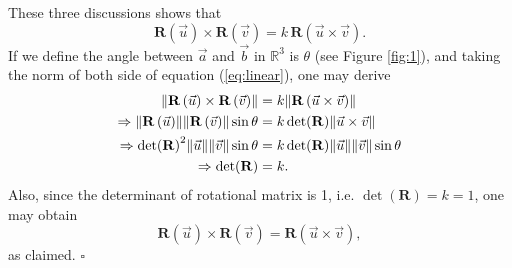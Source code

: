\documentclass[12pt]{article}
\begin{document}
These three discussions shows that 
\begin{equation}
\mathbf{R}\left(\vec{u}\right) \times \mathbf{R}\left(\vec{v}\right) = k\, \mathbf{R}\left(\vec{u}\times\vec{v}\right).
\label{eq:linear}
\end{equation}
If we define the angle between $\vec{a}$ and $\vec{b}$ in $\mathbb{R}^{3}$ is $\theta$ (see Figure \ref{fig:1}), and taking the norm of both side of equation (\ref{eq:linear}), one may derive
\begin{align}
 \norm{\mathbf{R}\left(\vec{u}\right) \times \mathbf{R}\left(\vec{v}\right)} 
	&= k \norm{\mathbf{R}\left(\vec{u}\times\vec{v}\right)}\\
\Rightarrow 
\norm{\mathbf{R}\left(\vec{u}\right)} \norm{\mathbf{R}\left(\vec{v}\right)} \sin\theta
	&= k \det(\mathbf{R}) \norm{\vec{u}\times\vec{v}}\\
\Rightarrow 
\det(\mathbf{R})^2 \norm{\vec{u}}\norm{\vec{v}} \sin\theta
	&= k \det(\mathbf{R}) \norm{\vec{u}}\norm{\vec{v}} \sin\theta\\
\Rightarrow 
\det(\mathbf{R}) &= k.
\end{align}
Also, since the determinant of rotational matrix is 1, i.e. $\det(\mathbf{R})=k=1$, one may obtain
\begin{equation}
\mathbf{R}\left(\vec{u}\right) \times \mathbf{R}\left(\vec{v}\right) = \mathbf{R}\left(\vec{u}\times\vec{v}\right),
\end{equation}
as claimed. $\square$


 
\newpage
\end{document}
